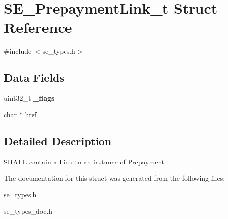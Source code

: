 \hypertarget{structSE__PrepaymentLink__t}{}\section{S\+E\+\_\+\+Prepayment\+Link\+\_\+t Struct Reference}
\label{structSE__PrepaymentLink__t}


{\ttfamily \#include $<$se\+\_\+types.\+h$>$}

\subsection*{Data Fields}
\begin{DoxyCompactItemize}
\item 
uint32\+\_\+t {\bfseries \+\_\+flags}
\item 
char $\ast$ \hyperlink{group__PrepaymentLink_ga0d4b57397c413bffec0e87b14a522afb}{href}
\end{DoxyCompactItemize}


\subsection{Detailed Description}
S\+H\+A\+LL contain a Link to an instance of Prepayment. 

The documentation for this struct was generated from the following files\+:\begin{DoxyCompactItemize}
\item 
se\+\_\+types.\+h\item 
se\+\_\+types\+\_\+doc.\+h\end{DoxyCompactItemize}
